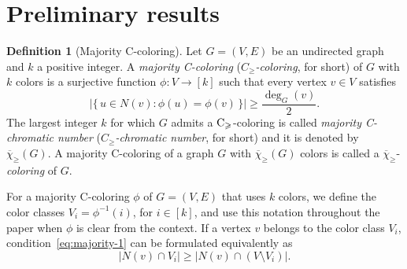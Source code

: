 \documentclass{article}
\theoremstyle{definition}
\newtheorem{definition}{Definition}
\newcommand{\mc}{\overline{\chi}_{\geqslant}}
\newcommand{\cg}{{\rm C}_{\geqslant}}
\begin{document}
\section{Preliminary results } 
\label{sec:pre}
\begin{definition}[Majority C-coloring] %
\label{def:cg}
Let $G = (V, E)$ be an undirected graph and $k$ a positive integer.  
A \textit{majority C-coloring} (\textit{$C_{\geqslant}$-coloring}, for short) of $G$ with $k$ colors is a surjective function $ \phi : V \rightarrow [k] $
such that every vertex $v \in V$ satisfies
\begin{equation} \label{eq:majority-1}
    \bigl|\{\, u \in N(v) : \phi(u) = \phi(v) \,\}\bigr| \ge \frac{\deg_G(v)}{2}.
\end{equation} 
The largest integer $k$ for which $G$ admits a $\cg$-coloring is called \emph{majority C-chromatic number} (\textit{$C_{\geqslant}$-chromatic number}, for short) and it is denoted by $\mc(G)$. A majority C-coloring of a graph $G$ with $\mc(G)$ colors is called a $\mc$-{\it coloring} of $G$. 
\end{definition}
For a majority C-coloring $\phi$ of $G=(V,E)$ that uses $k$ colors, we define the color classes $V_i=\phi^{-1}(i)$, for $i \in [k]$, and use this notation throughout the paper when $\phi$ is clear from the context. If a vertex $v$ belongs to the color class $V_i$, condition~\eqref{eq:majority-1} can be formulated equivalently as
\begin{equation} \label{eq:majority-2}
    |N(v) \cap V_i| \ge |N(v) \cap (V\setminus V_i)|.
\end{equation}
\end{document}

